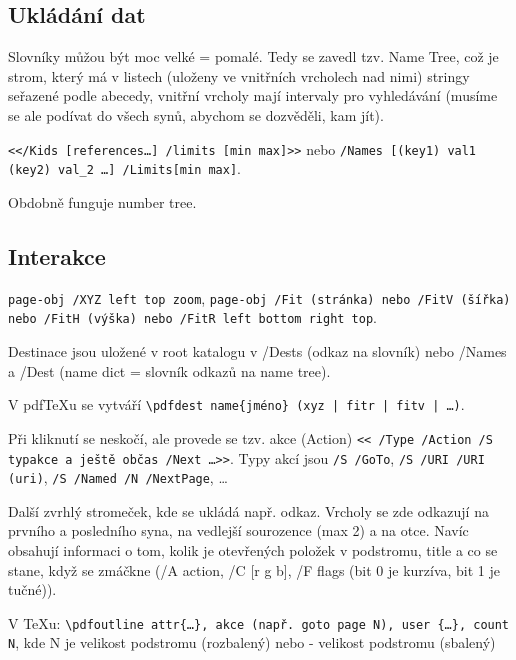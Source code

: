 \documentclass[12pt]{article}					%
\begin{document}
    \subsection{Ukládání dat}
        \begin{definice}
            Slovníky můžou být moc velké = pomalé. Tedy se zavedl tzv. Name Tree, což je strom, který má v listech (uloženy ve vnitřních vrcholech nad nimi) stringy seřazené podle abecedy, vnitřní vrcholy mají intervaly pro vyhledávání (musíme se ale podívat do všech synů, abychom se dozvěděli, kam jít).

            \verb|<</Kids [references…] /limits [min max]>>| nebo \verb|/Names [(key1) val1 (key2) val_2 …] /Limits[min max]|.

            Obdobně funguje number tree.
        \end{definice}

    \subsection{Interakce}
        \begin{definice}[Destinations = odkazy]
            \verb|page-obj /XYZ left top zoom|, \verb|page-obj /Fit (stránka) nebo /FitV (šířka) nebo /FitH (výška) nebo /FitR left bottom right top|.

            Destinace jsou uložené v root katalogu v /Dests (odkaz na slovník) nebo /Names a /Dest (name dict = slovník odkazů na name tree).

            V pdfTeXu se vytváří \verb/\pdfdest name{jméno} (xyz | fitr | fitv | …)/.

            Při kliknutí se neskočí, ale provede se tzv. akce (Action) \verb|<< /Type /Action /S typakce a ještě občas /Next …>>|. Typy akcí jsou \verb|/S /GoTo|, \verb|/S /URI /URI (uri)|, \verb|/S /Named /N /NextPage|, …
        \end{definice}

        \begin{definice}[Outline]
            Další zvrhlý stromeček, kde se ukládá např. odkaz. Vrcholy se zde odkazují na prvního a posledního syna, na vedlejší sourozence (max 2) a na otce. Navíc obsahují informaci o tom, kolik je otevřených položek v podstromu, title a co se stane, když se zmáčkne (/A action, /C [r g b], /F flags (bit 0 je kurzíva, bit 1 je tučné)).

            V TeXu: \verb|\pdfoutline attr{…}, akce (např. goto page N), user {…}, count N|, kde N je velikost podstromu (rozbalený) nebo - velikost podstromu (sbalený)
        \end{definice}
\end{document}

